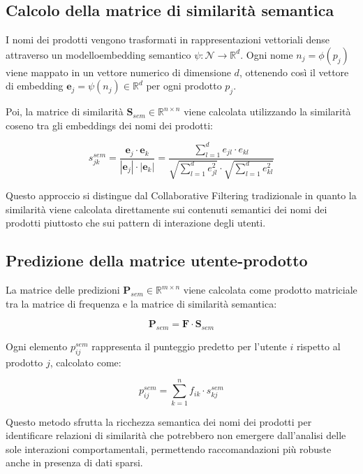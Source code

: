 \subsection{Calcolo della matrice di similarità semantica}

I nomi dei prodotti vengono trasformati in rappresentazioni vettoriali dense attraverso un \gls{modelloembedding} semantico $\psi: \mathcal{N} \rightarrow \mathbb{R}^d$. Ogni nome $n_j = \phi(p_j)$ viene mappato in un vettore numerico di dimensione $d$, ottenendo così il vettore di embedding $\mathbf{e}_j = \psi(n_j) \in \mathbb{R}^d$ per ogni prodotto $p_j$.

Poi, la matrice di similarità $\mathbf{S}_{sem} \in \mathbb{R}^{n \times n}$ viene calcolata utilizzando la similarità coseno tra gli embeddings dei nomi dei prodotti:

\begin{equation}
s_{jk}^{sem} = \frac{\mathbf{e}_j \cdot \mathbf{e}_k}{|\mathbf{e}_j| \cdot |\mathbf{e}_k|} = \frac{\sum_{l=1}^{d} e_{jl} \cdot e_{kl}}{\sqrt{\sum_{l=1}^{d} e_{jl}^2} \cdot \sqrt{\sum_{l=1}^{d} e_{kl}^2}}
\end{equation}

Questo approccio si distingue dal Collaborative Filtering tradizionale in quanto la similarità viene calcolata direttamente sui contenuti semantici dei nomi dei prodotti piuttosto che sui pattern di interazione degli utenti.

\subsection{Predizione della matrice utente-prodotto}

La matrice delle predizioni $\mathbf{P}_{sem} \in \mathbb{R}^{m \times n}$ viene calcolata come prodotto matriciale tra la matrice di frequenza e la matrice di similarità semantica:

\begin{equation}
\mathbf{P}_{sem} = \mathbf{F} \cdot \mathbf{S}_{sem}
\end{equation}

Ogni elemento $p_{ij}^{sem}$ rappresenta il punteggio predetto per l'utente $i$ rispetto al prodotto $j$, calcolato come:

\begin{equation}
p_{ij}^{sem} = \sum_{k=1}^{n} f_{ik} \cdot s_{kj}^{sem}
\end{equation}

Questo metodo sfrutta la ricchezza semantica dei nomi dei prodotti per identificare relazioni di similarità che potrebbero non emergere dall'analisi delle sole interazioni comportamentali, permettendo raccomandazioni più robuste anche in presenza di dati sparsi.


